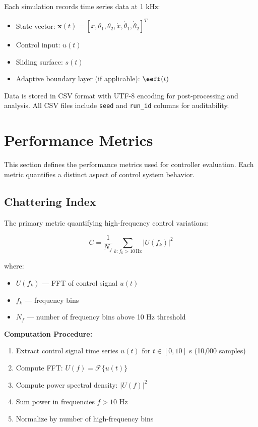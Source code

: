 Each simulation records time series data at 1 kHz:
\begin{itemize}
    \item State vector: $\mathbf{x}(t) = [x, \theta_1, \theta_2, \dot{x}, \dot{\theta}_1, \dot{\theta}_2]^T$
    \item Control input: $u(t)$
    \item Sliding surface: $s(t)$
    \item Adaptive boundary layer (if applicable): $\eeff(t)$
\end{itemize}

Data is stored in CSV format with UTF-8 encoding for post-processing and analysis. All CSV files include \texttt{seed} and \texttt{run\_id} columns for auditability.

\section{Performance Metrics}
\label{sec:performance_metrics}

This section defines the performance metrics used for controller evaluation. Each metric quantifies a distinct aspect of control system behavior.

\subsection{Chattering Index}
\label{subsec:chattering_metric}

The primary metric quantifying high-frequency control variations:

\begin{equation}
\label{eq:chattering_index_formula}
C = \frac{1}{N_f} \sum_{k: f_k > 10 \, \text{Hz}} |U(f_k)|^2
\end{equation}

where:
\begin{itemize}
    \item $U(f_k)$ --- FFT of control signal $u(t)$
    \item $f_k$ --- frequency bins
    \item $N_f$ --- number of frequency bins above 10 Hz threshold
\end{itemize}

\textbf{Computation Procedure:}
\begin{enumerate}
    \item Extract control signal time series $u(t)$ for $t \in [0, 10]$ s (10,000 samples)
    \item Compute FFT: $U(f) = \mathcal{F}\{u(t)\}$
    \item Compute power spectral density: $|U(f)|^2$
    \item Sum power in frequencies $f > 10$ Hz
    \item Normalize by number of high-frequency bins
\end{enumerate}

